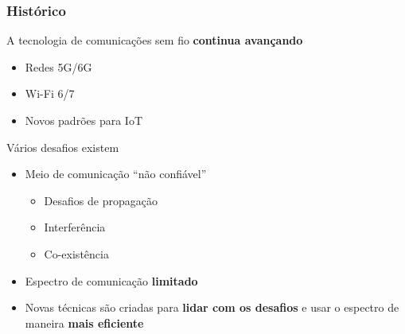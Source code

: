 \documentclass[10pt,xcolor=table]{beamer}
\begin{document}
\begin{frame}
	\frametitle{Histórico}
    \begin{block}{A tecnologia de comunicações sem fio \textbf{continua avançando}}
		\begin{itemize}
            \item Redes 5G/6G
            \vspace{1mm}
            \item Wi-Fi 6/7
            \vspace{1mm}
            \item Novos padrões para IoT
		\end{itemize}
	\end{block}
    \begin{alertblock}{Vários desafios existem}
		\begin{itemize}
			\item Meio de comunicação ``não confiável''
            \begin{itemize}
                \item Desafios de propagação
                \vspace{1mm}
                \item Interferência
                \vspace{1mm}
                \item Co-existência
            \end{itemize}
            \item Espectro de comunicação \textbf{limitado}
            \vspace{2mm}
            \item Novas técnicas são criadas para \textbf{lidar com os desafios} e usar o espectro de maneira \textbf{mais eficiente}
		\end{itemize}
	\end{alertblock}
\end{frame}
\end{document}
